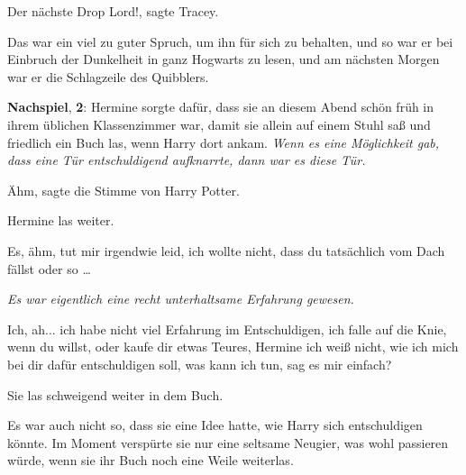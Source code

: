 \glqq{}Der nächste Drop Lord!\grqq{}, sagte Tracey.

Das war ein viel zu guter Spruch, um ihn für sich zu behalten, und so war er bei
Einbruch der Dunkelheit in ganz Hogwarts zu lesen, und am nächsten Morgen war er
die Schlagzeile des Quibblers.

\textbf{Nachspiel}, \textbf{2}: Hermine sorgte dafür, dass sie an diesem Abend
schön früh in ihrem üblichen Klassenzimmer war, damit sie allein auf einem Stuhl
saß und friedlich ein Buch las, wenn Harry dort ankam.
\emph{Wenn es eine Möglichkeit gab, dass eine Tür entschuldigend aufknarrte,
dann war es diese Tür.}

\glqq{}Ähm\grqq{}, sagte die Stimme von Harry Potter.

Hermine las weiter.

\glqq{}Es, ähm, tut mir irgendwie leid, ich wollte nicht, dass du tatsächlich vom
Dach fällst oder so …\grqq{}

\emph{Es war eigentlich eine recht unterhaltsame Erfahrung gewesen.}

\glqq{}Ich, ah... ich habe nicht viel Erfahrung im Entschuldigen, ich falle auf
die Knie, wenn du willst, oder kaufe dir etwas Teures, Hermine ich weiß nicht,
wie ich mich bei dir dafür entschuldigen soll, was kann ich tun, sag es mir
einfach?\grqq{}

Sie las schweigend weiter in dem Buch.

Es war auch nicht so, dass sie eine Idee hatte, wie Harry sich entschuldigen
könnte. Im Moment verspürte sie nur eine seltsame Neugier, was wohl passieren
würde, wenn sie ihr Buch noch eine Weile weiterlas.

